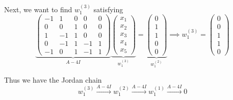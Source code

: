 \begin{example}
\begin{enumerate}
				Next, we want to find $w_1^{(3)}$ satisfying
				\begin{equation}
					\underbrace{\begin{pmatrix}
						-1 & 1 & 0 & 0 & 0 \\
						0 & 0 & 1 & 0 & 0 \\
						1 & -1 & 1 & 0 & 0 \\
						0 & -1 & 1 & -1 & 1 \\
						-1 & 0 & 1 & -1 & 1
					\end{pmatrix}}_{A - 4I} \underbrace{\begin{pmatrix} x_1 \\ x_2 \\ x_3 \\ x_4 \\ x_5 \end{pmatrix}}_{w_1^{(3)}} = \underbrace{\begin{pmatrix} 0 \\ 1 \\ 1 \\ 0 \\ 0 \end{pmatrix}}_{w_1^{(2)}} \implies w_1^{(3)} = \begin{pmatrix} 0 \\ 0 \\ 1 \\ 1 \\ 0 \end{pmatrix}
				\end{equation}

				Thus we have the Jordan chain
				\begin{equation}
					w_1^{(3)} \xrightarrow{A - 4I} w_1^{(2)} \xrightarrow{A - 4I} w_1^{(1)} \xrightarrow{A - 4I} 0
				\end{equation}


\end{enumerate}
\end{example}
